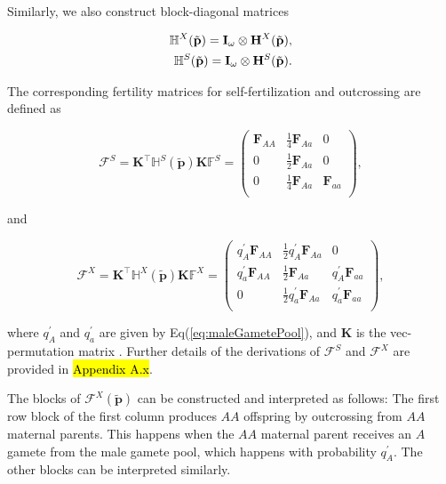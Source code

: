 \documentclass[11pt]{article}
\def\mbf#1{\mathbf{#1}}
\def\mbb#1{\mathbb{#1}}
\def\mcal#1{\mathcal{#1}}
\newcommand{\bo}[1]{{\bf #1}}
\newcommand{\om}{\omega}
\newcommand{\kron}{\otimes}
\begin{document}
Similarly, we also construct block-diagonal matrices
\begin{linenomath*}
\begin{eqnarray}
	\mathbb{H}^X(\tilde{\bo p}) = \bo I_\om \kron \bo H^X(\tilde{\bo p}),\\
	\mathbb{H}^S(\tilde{\bo p}) = \bo I_\om \kron \bo H^S(\tilde{\bo p}).
\end{eqnarray}
\end{linenomath*}
The corresponding fertility matrices for self-fertilization and outcrossing are defined as
\begin{linenomath*}
\begin{equation} \label{eq:BlkFS_appendix}
	\mcal{F}^S = \mbf{K}^{\intercal} \mbb{H}^S(\tilde{\mbf{p}}) \mbf{K} \mbb{F}^S = 
			\left(
			\begin{array}{ccc}
				\mbf{F}_{AA} & \frac{1}{4} \mbf{F}_{Aa} & 0 \\
				0 & \frac{1}{2} \mbf{F}_{Aa} & 0 \\
				0 & \frac{1}{4} \mbf{F}_{Aa} & \mbf{F}_{aa}\\
			\end{array} \right), 
\end{equation}
\end{linenomath*}
\noindent and 
\begin{linenomath*}
\begin{equation} \label{eq:BlkFX_appendix}
	\mcal{F}^X = \mbf{K}^{\intercal} \mbb{H}^X(\tilde{\mbf{p}}) \mbf{K} \mbb{F}^X = 
			\left(
			\begin{array}{ccc}
				q^{\prime}_{A} \mbf{F}_{AA} & \frac{1}{2} q^{\prime}_{A} \mbf{F}_{Aa} & 0 \\ 
				q^{\prime}_{a} \mbf{F}_{AA} & \frac{1}{2} \mbf{F}_{Aa} & q^{\prime}_{A} \mbf{F}_{aa}  \\ 
				0 & \frac{1}{2} q^{\prime}_{a} \mbf{F}_{Aa} & q^{\prime}_{a} \mbf{F}_{aa}  \\
			\end{array} \right),
\end{equation}
\end{linenomath*}

\noindent where $q^{\prime}_A$ and $q^{\prime}_a$ are given by Eq(\ref{eq:maleGametePool}), and $\mbf{K}$ is the vec-permutation matrix \citep{HendersonSearle1981}. Further details of the derivations of $\mcal{F}^S$ and $\mcal{F}^X$ are provided in \hl{Appendix A.x}. 

The blocks of $\mcal{F}^X(\tilde{\mbf{p}})$ can be constructed and interpreted as follows: The first row block of the first column produces $AA$ offspring by outcrossing from $AA$ maternal parents. This happens when the $AA$ maternal parent receives an $A$ gamete from the male gamete pool, which happens with probability $q^{\prime}_{A}$. The other blocks can be interpreted similarly.
\end{document}
